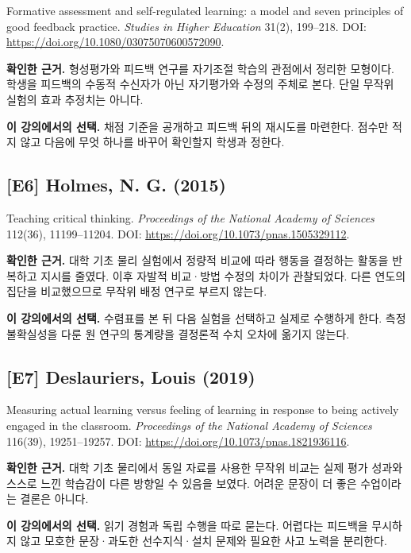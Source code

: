 \documentclass[
  10pt,
  a4paper,
]{article}
\begin{document}
Formative assessment and self-regulated learning: a model and seven
principles of good feedback practice. \emph{Studies in Higher Education}
31(2), 199--218. DOI: \url{https://doi.org/10.1080/03075070600572090}.

\textbf{확인한 근거.} 형성평가와 피드백 연구를 자기조절 학습의 관점에서
정리한 모형이다. 학생을 피드백의 수동적 수신자가 아닌 자기평가와 수정의
주체로 본다. 단일 무작위 실험의 효과 추정치는 아니다.

\textbf{이 강의에서의 선택.} 채점 기준을 공개하고 피드백 뒤의 재시도를
마련한다. 점수만 적지 않고 다음에 무엇 하나를 바꾸어 확인할지 학생과
정한다.

\subsection{{[}E6{]} Holmes, N. G. (2015)}\label{e6-holmes-n.-g.-2015}

Teaching critical thinking. \emph{Proceedings of the National Academy of
Sciences} 112(36), 11199--11204. DOI:
\url{https://doi.org/10.1073/pnas.1505329112}.

\textbf{확인한 근거.} 대학 기초 물리 실험에서 정량적 비교에 따라 행동을
결정하는 활동을 반복하고 지시를 줄였다. 이후 자발적 비교·방법 수정의
차이가 관찰되었다. 다른 연도의 집단을 비교했으므로 무작위 배정 연구로
부르지 않는다.

\textbf{이 강의에서의 선택.} 수렴표를 본 뒤 다음 실험을 선택하고 실제로
수행하게 한다. 측정 불확실성을 다룬 원 연구의 통계량을 결정론적 수치
오차에 옮기지 않는다.

\subsection{{[}E7{]} Deslauriers, Louis
(2019)}\label{e7-deslauriers-louis-2019}

Measuring actual learning versus feeling of learning in response to
being actively engaged in the classroom. \emph{Proceedings of the
National Academy of Sciences} 116(39), 19251--19257. DOI:
\url{https://doi.org/10.1073/pnas.1821936116}.

\textbf{확인한 근거.} 대학 기초 물리에서 동일 자료를 사용한 무작위
비교는 실제 평가 성과와 스스로 느낀 학습감이 다른 방향일 수 있음을
보였다. 어려운 문장이 더 좋은 수업이라는 결론은 아니다.

\textbf{이 강의에서의 선택.} 읽기 경험과 독립 수행을 따로 묻는다.
어렵다는 피드백을 무시하지 않고 모호한 문장·과도한 선수지식·설치 문제와
필요한 사고 노력을 분리한다.
\end{document}

